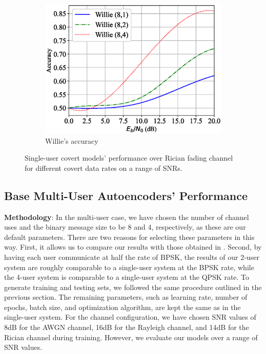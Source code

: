 \begin{figure}[tp!]
\begin{subfigure}{0.28\textwidth}
		\includegraphics[width=\linewidth]{figs/willie_accuracy_rician}
		\caption{Willie's accuracy}
		\label{fig:rician_resutls_willie}
	\end{subfigure}
	\caption{Single-user covert models' performance over Rician fading channel for different covert data rates on a range of SNRs.}
	\label{fig:rician_resutls}
\end{figure}

\subsection{Base Multi-User Autoencoders' Performance}
\textbf{Methodology}: In the multi-user case, we have chosen the number of channel uses and the binary message size to be 8 and 4, respectively, as these are our default parameters. There are two reasons for selecting these parameters in this way. First, it allows us to compare our results with those obtained in \cite{o2017introduction}. Second, by having each user communicate at half the rate of BPSK, the results of our 2-user system are roughly comparable to a single-user system at the BPSK rate, while the 4-user system is comparable to a single-user system at the QPSK rate. To generate training and testing sets, we followed the same procedure outlined in the previous section. The remaining parameters, such as learning rate, number of epochs, batch size, and optimization algorithm, are kept the same as in the single-user system. For the channel configuration, we have chosen SNR values of 8dB for the AWGN channel, 16dB for the Rayleigh channel, and 14dB for the Rician channel during training. However, we evaluate our models over a range of SNR values.

